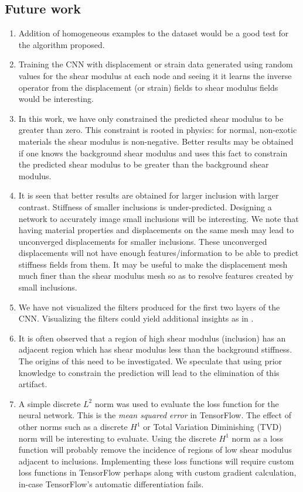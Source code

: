 \documentclass[12pt]{article}
\begin{document}
\subsection{Future work}
\begin{enumerate}
\item{Addition of homogeneous examples to the dataset would be a good test for the algorithm proposed.}
\item{Training the CNN with displacement or strain data generated using random values for the shear modulus at each node and seeing it it learns the inverse operator from the displacement (or strain) fields to shear modulus fields would be interesting. }
\item{In this work, we have only constrained the predicted shear modulus to be greater than zero. This constraint is rooted in physics: for normal, non-exotic materials the shear modulus is non-negative. Better results may be obtained if one knows the background shear modulus and uses this fact to constrain the predicted shear modulus to be greater than the background shear modulus.}
\item{It is seen that better results are obtained for larger inclusion with larger contrast. Stiffness of smaller inclusions is under-predicted. Designing a network to accurately image small inclusions will be interesting. We note that having material properties and displacements on the same mesh may lead to unconverged displacements for smaller inclusions. These unconverged displacements will not have enough features/information to be able to predict stiffness fields from them. It may be useful to make the displacement mesh much finer than the shear modulus mesh so as to resolve features created by small inclusions.}
\item{We have not visualized the filters produced for the first two layers of the CNN. Visualizing the filters could yield additional insights as in \cite{paper:pateloberai2019}.}
\item{It is often observed that a region of high shear modulus (inclusion) has an adjacent region which has shear modulus less than the background stiffness. The origins of this need to be investigated. We speculate that using prior knowledge to constrain the prediction will lead to the elimination of this artifact.}
\item{A simple discrete $L^2$ norm was used to evaluate the loss function for the neural network. This is the \textit{mean squared error} in TensorFlow. The effect of other norms such as a discrete $H^1$ or Total Variation Diminishing (TVD) norm will be interesting to evaluate. Using the discrete $H^1$ norm as a loss function will probably remove the incidence of regions of low shear modulus adjacent to inclusions. Implementing these loss functions will require custom loss functions in TensorFlow perhaps along with custom gradient calculation, in-case TensorFlow's automatic differentiation fails.}

\end{enumerate}
\end{document}
